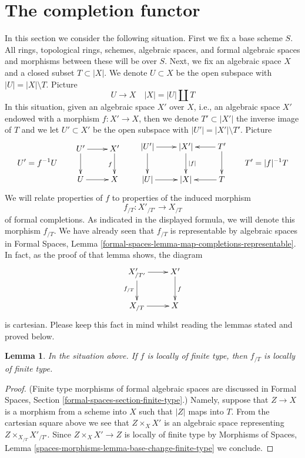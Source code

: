 \documentclass[10pt,a4paper]{amsart}
\theoremstyle{plain}
\newtheorem{lemma}[subsection]{Lemma}
\theoremstyle{definition}
\theoremstyle{remark}
\numberwithin{equation}{subsection}
\begin{document}
\section{The completion functor}
\label{section-completion-functor}

\noindent
In this section we consider the following situation.
First we fix a base scheme $S$. All rings, topological rings,
schemes, algebraic spaces, and formal algebraic spaces and
morphisms between these will be over $S$. Next, we fix an
algebraic space $X$ and a closed subset $T \subset |X|$.
We denote $U \subset X$ be the open subspace with $|U| = |X| \setminus T$.
Picture
$$
U \to X \quad |X| = |U| \amalg T
$$
In this situation, given an algebraic space $X'$ over $X$, i.e., an
algebraic space $X'$ endowed with a morphism $f : X' \to X$, then we
denote $T' \subset |X'|$ the inverse image of $T$ and we let $U' \subset X'$
be the open subspace with $|U'| = |X'| \setminus T'$. Picture
$$
U' = f^{-1}U
\quad\quad
\vcenter{
\xymatrix{
U' \ar[d] \ar[r] & X' \ar[d]_f \\
U \ar[r] & X
}
}
\quad\quad
\vcenter{
\xymatrix{
|U'| \ar[r] \ar[d] & |X'| \ar[d]^{|f|} & T' \ar[l] \ar[d] \\
|U| \ar[r] & |X| & T \ar[l]
}
}
\quad\quad
T' = |f|^{-1}T
$$
We will relate properties of $f$ to properties of the induced morphism
$$
f_{/T} : X'_{/T'} \longrightarrow X_{/T}
$$
of formal completions. As indicated in the displayed formula, we will
denote this morphism $f_{/T}$. We have already seen that
$f_{/T}$ is representable by algebraic spaces in
Formal Spaces, Lemma
\ref{formal-spaces-lemma-map-completions-representable}.
In fact, as the proof of that lemma shows, the diagram
$$
\xymatrix{
X'_{/T'} \ar[d]_{f_{/T}} \ar[r] & X' \ar[d]^f \\
X_{/T} \ar[r] & X
}
$$
is cartesian. Please keep this fact in mind whilst reading the lemmas stated
and proved below.

\begin{lemma}
\label{lemma-map-completions-finite-type}
In the situation above. If $f$ is locally of finite type, then
$f_{/T}$ is locally of finite type.
\end{lemma}

\begin{proof}
(Finite type morphisms of formal algebraic spaces are discussed in
Formal Spaces, Section \ref{formal-spaces-section-finite-type}.)
Namely, suppose that $Z \to X$ is a morphism from a scheme into $X$ such
that $|Z|$ maps into $T$. From the cartesian square above we see that
$Z \times_X X'$ is an algebraic space representing
$Z \times_{X_{/T}} X'_{/T'}$. Since $Z \times_X X' \to Z$
is locally of finite type by Morphisms of Spaces, Lemma
\ref{spaces-morphisms-lemma-base-change-finite-type} we conclude.
\end{proof}
\end{document}

